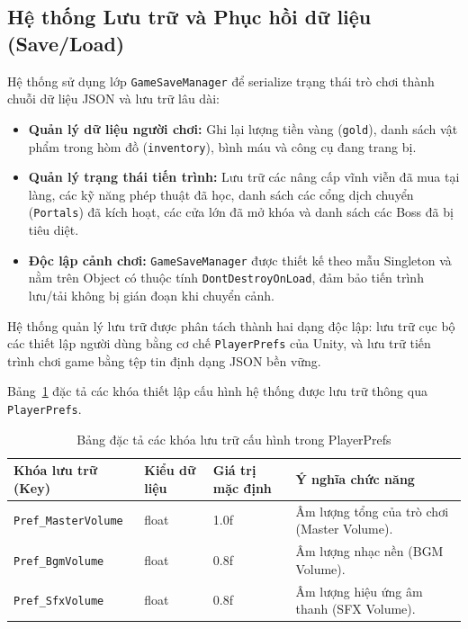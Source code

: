 \documentclass[../DoAn.tex]{subfiles}
\begin{document}
\subsection{Hệ thống Lưu trữ và Phục hồi dữ liệu (Save/Load)}
\label{section:4.4.1}
Hệ thống sử dụng lớp \texttt{GameSaveManager} để serialize trạng thái trò chơi thành chuỗi dữ liệu JSON và lưu trữ lâu dài:
\begin{itemize}
    \item \textbf{Quản lý dữ liệu người chơi:} Ghi lại lượng tiền vàng (\texttt{gold}), danh sách vật phẩm trong hòm đồ (\texttt{inventory}), bình máu và công cụ đang trang bị.
    \item \textbf{Quản lý trạng thái tiến trình:} Lưu trữ các nâng cấp vĩnh viễn đã mua tại làng, các kỹ năng phép thuật đã học, danh sách các cổng dịch chuyển (\texttt{Portals}) đã kích hoạt, các cửa lớn đã mở khóa và danh sách các Boss đã bị tiêu diệt.
    \item \textbf{Độc lập cảnh chơi:} \texttt{GameSaveManager} được thiết kế theo mẫu Singleton và nằm trên Object có thuộc tính \texttt{DontDestroyOnLoad}, đảm bảo tiến trình lưu/tải không bị gián đoạn khi chuyển cảnh.
\end{itemize}

Hệ thống quản lý lưu trữ được phân tách thành hai dạng độc lập: lưu trữ cục bộ các thiết lập người dùng bằng cơ chế \texttt{PlayerPrefs} của Unity, và lưu trữ tiến trình chơi game bằng tệp tin định dạng JSON bền vững.

Bảng~\ref{table:player_prefs_storage} đặc tả các khóa thiết lập cấu hình hệ thống được lưu trữ thông qua \texttt{PlayerPrefs}.

\begin{table}[H]
\centering
\begin{tabular}{|p{4.5cm}|p{2.0cm}|p{2.0cm}|p{5.5cm}|}
\hline
\textbf{Khóa lưu trữ (Key)} & \textbf{Kiểu dữ liệu} & \textbf{Giá trị mặc định} & \textbf{Ý nghĩa chức năng} \\ \hline
\texttt{Pref\_MasterVolume} & float & 1.0f & Âm lượng tổng của trò chơi (Master Volume). \\ \hline
\texttt{Pref\_BgmVolume} & float & 0.8f & Âm lượng nhạc nền (BGM Volume). \\ \hline
\texttt{Pref\_SfxVolume} & float & 0.8f & Âm lượng hiệu ứng âm thanh (SFX Volume). \\ \hline
\end{tabular}
\caption{Bảng đặc tả các khóa lưu trữ cấu hình trong PlayerPrefs}
\label{table:player_prefs_storage}
\end{table}
\end{document}
